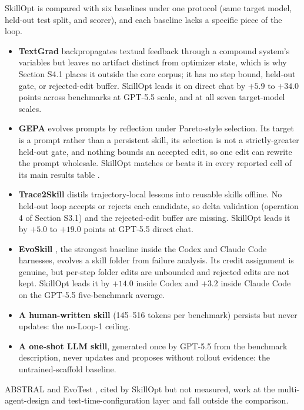 \documentclass[
]{article}
\providecommand{\tightlist}{%
  \setlength{\itemsep}{0pt}\setlength{\parskip}{0pt}}
\begin{document}
SkillOpt is compared with six baselines under one protocol (same target
model, held-out test split, and scorer), and each baseline lacks a
specific piece of the loop.

\begin{itemize}
\tightlist
\item
  \textbf{TextGrad} \cite{yuksekgonul2024textgrad} backpropagates
  textual feedback through a compound system's variables but leaves no
  artifact distinct from optimizer state, which is why Section S4.1
  places it outside the core corpus; it has no step bound, held-out
  gate, or rejected-edit buffer. SkillOpt leads it on direct chat by
  \(+5.9\) to \(+34.0\) points across benchmarks at GPT-5.5 scale, and
  at all seven target-model scales.
\item
  \textbf{GEPA} \cite{agrawal2025gepa} evolves prompts by reflection
  under Pareto-style selection. Its target is a prompt rather than a
  persistent skill, its selection is not a strictly-greater held-out
  gate, and nothing bounds an accepted edit, so one edit can rewrite the
  prompt wholesale. SkillOpt matches or beats it in every reported cell
  of its main results table \cite{yang2026skillopt}.
\item
  \textbf{Trace2Skill} \cite{ni2026trace2skill} distils
  trajectory-local lessons into reusable skills offline. No held-out
  loop accepts or rejects each candidate, so delta validation (operation
  4 of Section S3.1) and the rejected-edit buffer are missing. SkillOpt
  leads it by \(+5.0\) to \(+19.0\) points at GPT-5.5 direct chat.
\item
  \textbf{EvoSkill} \cite{alzubi2026evoskill}, the strongest baseline
  inside the Codex and Claude Code harnesses, evolves a skill folder
  from failure analysis. Its credit assignment is genuine, but per-step
  folder edits are unbounded and rejected edits are not kept. SkillOpt
  leads it by \(+14.0\) inside Codex and \(+3.2\) inside Claude Code on
  the GPT-5.5 five-benchmark average.
\item
  \textbf{A human-written skill} (145--516 tokens per benchmark)
  persists but never updates: the no-Loop-1 ceiling.
\item
  \textbf{A one-shot LLM skill}, generated once by GPT-5.5 from the
  benchmark description, never updates and proposes without rollout
  evidence: the untrained-scaffold baseline.
\end{itemize}

ABSTRAL \cite{song2026abstral} and EvoTest \cite{he2025evotest}, cited
by SkillOpt but not measured, work at the multi-agent-design and
test-time-configuration layer and fall outside the comparison.
\end{document}
